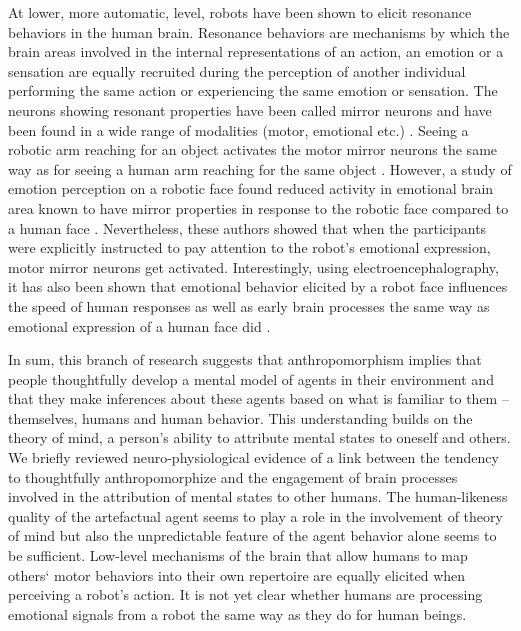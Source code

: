 \documentclass{frontiersSCNS} %
\begin{document}
At lower, more automatic, level, robots have been shown to elicit resonance
behaviors in the human brain. Resonance behaviors \citep{Rizzolatti1999} are
mechanisms by which the brain areas involved in the internal representations of
an action, an emotion or a sensation are equally recruited during the perception
of another individual performing the same action or experiencing the same
emotion or sensation.  The neurons showing resonant properties have been called
mirror neurons and have been found in a wide range of modalities (motor,
emotional etc.) . Seeing a robotic arm reaching for an object
activates the motor mirror neurons the same way as for seeing a human arm
reaching for the same object \citep{Gazzola2007, oberman_eeg_2007}. However, a
study of emotion perception on a robotic face found reduced activity in
emotional brain area known to have mirror properties in response to the robotic
face compared to a human face \citep{Chaminade2010}. Nevertheless, these authors
showed that when the participants were explicitly instructed to pay attention to
the robot's emotional expression, motor mirror neurons get activated.
Interestingly, using electroencephalography,  it has also been shown that
emotional behavior elicited by a robot face influences the speed of human
responses as well as early brain processes the same way as emotional expression
of a human face did \citep{Dubal2010}.


%


In sum, this branch of research suggests that anthropomorphism implies that
people thoughtfully develop a mental model of agents in their environment and
that they make inferences about these agents based on what is familiar to them
-- themselves, humans and human behavior. This understanding builds on the
theory of mind,  a
person's ability to attribute mental states to oneself and others. 
We briefly reviewed  neuro-physiological evidence of a link between the tendency
to thoughtfully anthropomorphize and the engagement of brain processes involved
in the attribution of mental states to other humans. The human-likeness quality
of the artefactual agent seems to play a role in the involvement of theory of
mind but also the unpredictable feature of the agent behavior alone seems to be
sufficient. Low-level mechanisms of the brain that allow humans to map others`
motor behaviors into their own repertoire are equally elicited when perceiving a
robot's action. It is not yet clear whether humans are processing emotional
signals from a robot the same way as they do for human beings. 
\end{document}
